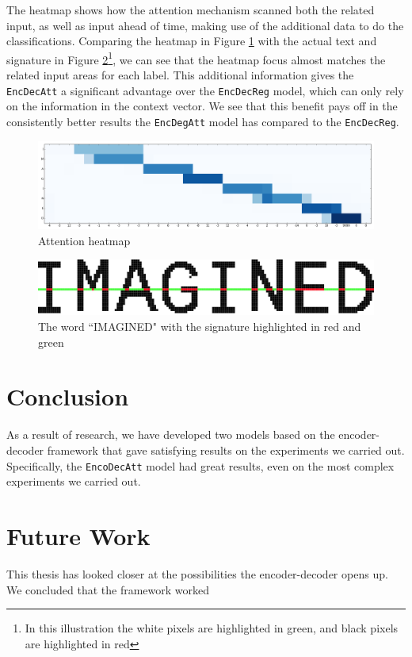 The heatmap shows how the attention mechanism scanned both the related input, as well as input ahead of time, making use of the additional data to do the classifications. Comparing the heatmap in Figure \ref{fig:attention_heatmap} with the actual text and signature in Figure  \ref{fig:imagine_highlighted}\footnote{In this illustration the white pixels are highlighted in green, and black pixels are highlighted in red}, we can see that the heatmap focus almost matches the related input areas for each label. This additional information gives the {\tt EncDecAtt} a significant advantage over the {\tt EncDecReg} model, which can only rely on the information in the context vector. We see that this benefit pays off in the consistently better results the {\tt EncDegAtt} model has compared to the {\tt EncDecReg}.

\begin{figure}[h]
    \centering
    \includegraphics[width=1\textwidth]{fig/conclusion/attention_crop.png}
    \caption{Attention heatmap}
    \label{fig:attention_heatmap}
\end{figure}

\begin{figure}[h]
    \centering
    \includegraphics[width=1\textwidth]{fig/conclusion/imagined_grid_exported.png}
    \caption{The word ``IMAGINED" with the signature highlighted in red and green}
    \label{fig:imagine_highlighted}
\end{figure}


\section{Conclusion}
As a result of research, we have developed two models based on the encoder-decoder framework that gave satisfying results on the experiments we carried out. Specifically, the {\tt EncoDecAtt} model had great results, even on the most complex experiments we carried out.


\section{Future Work}
This thesis has looked closer at the possibilities the encoder-decoder opens up. We concluded that the framework worked 